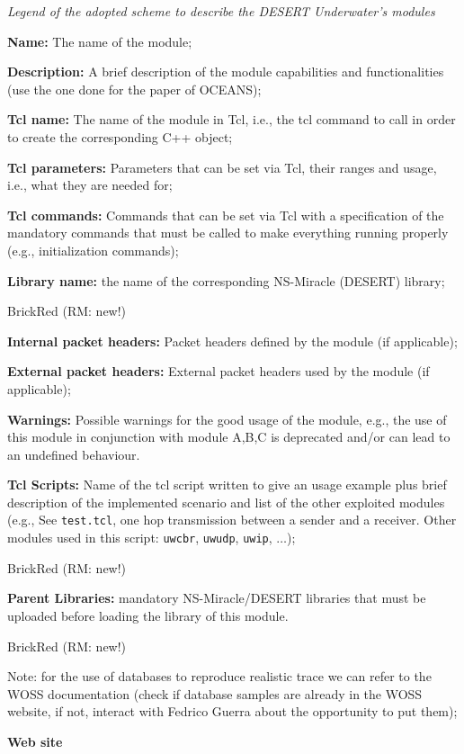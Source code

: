 \documentclass[11pt,journal,draftclsnofoot,onecolumn,twoside,letterpaper]{IEEEtran}
\newcommand{\RM}[1]{\begin{color}{BrickRed} (RM: #1) \end{color}}
\theoremstyle{definition} \newtheorem{definition}[]{Definition}
\theoremstyle{theorem} \newtheorem{theorem}[]{Theorem}
\begin{document}
 {\it Legend of the adopted scheme to describe the DESERT Underwater's modules}
 \begin{description}
   \item {\bf Name:} The name of the module;
   \item {\bf Description:} A brief description of the module capabilities and functionalities (use the one done for the paper of OCEANS);
   \item {\bf Tcl name:} The name of the module in Tcl, i.e., the tcl command to call in order to create the corresponding C++ object;
   \item {\bf Tcl parameters:} Parameters that can be set via Tcl, their ranges and usage, i.e., what they are needed for;
   \item {\bf Tcl commands:} Commands that can be set via Tcl with a specification of the mandatory commands that must be called to make everything running properly (e.g., initialization commands);
   \item {\bf Library name:} the name of the corresponding NS-Miracle (DESERT) library; \RM{new!}
   \item {\bf Internal packet headers:} Packet headers defined by the module (if applicable);
   \item {\bf External packet headers:} External packet headers used by the module (if applicable);
   \item {\bf Warnings:} Possible warnings for the good usage of the module, e.g., the use of this module in conjunction with module A,B,C is deprecated and/or can lead to an undefined behaviour.
   \item {\bf Tcl Scripts:} Name of the tcl script written to give an usage example plus brief description of the implemented scenario and list of the other exploited modules (e.g., See {\tt test.tcl}, one hop transmission between a sender and a receiver. Other modules used in this script: {\tt uwcbr}, {\tt uwudp}, {\tt uwip}, $\dots$); \RM{new!}
   \item {\bf Parent Libraries:} mandatory NS-Miracle/DESERT libraries that must be uploaded before loading the library of this module. \RM{new!}  
\end{description}

Note: for the use of databases to reproduce realistic trace we can refer to the WOSS documentation (check if database samples are already in the WOSS website, if not, interact with Fedrico Guerra about the opportunity to put them);

{\bf Web site}
\end{document}

